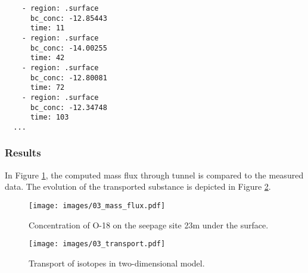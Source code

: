 \begin{verbatim}
    - region: .surface
      bc_conc: -12.85443
      time: 11
    - region: .surface
      bc_conc: -14.00255
      time: 42
    - region: .surface
      bc_conc: -12.80081
      time: 72
    - region: .surface
      bc_conc: -12.34748
      time: 103
  ...
\end{verbatim}

\subsubsection{Results}\label{results}

In Figure \ref{fig:conc_graph}, the computed mass flux through tunnel is
compared to the measured data. The evolution of the transported
substance is depicted in Figure \ref{fig:mass_real}.

\begin{figure}[htbp]
\centering
\texttt{[image: images/03\_mass\_flux.pdf]}
\caption{Concentration of O-18 on the seepage site 23m under the
surface.\label{fig:conc_graph}}
\end{figure}

\begin{figure}[htbp]
\centering
\texttt{[image: images/03\_transport.pdf]}
\caption{Transport of isotopes in two-dimensional
model.\label{fig:mass_real}}
\end{figure}
